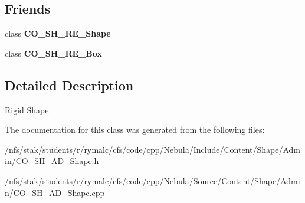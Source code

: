 \subsection*{Friends}
\begin{DoxyCompactItemize}
\item 
\hypertarget{classContent_1_1Shape_1_1Admin_1_1Shape_ada14878e2fc0904acf45a44502c5cca0}{
class {\bfseries CO\_\-SH\_\-RE\_\-Shape}}
\label{classContent_1_1Shape_1_1Admin_1_1Shape_ada14878e2fc0904acf45a44502c5cca0}

\item 
\hypertarget{classContent_1_1Shape_1_1Admin_1_1Shape_ae598bfbad4f6a4fbca774ede1fb477d9}{
class {\bfseries CO\_\-SH\_\-RE\_\-Box}}
\label{classContent_1_1Shape_1_1Admin_1_1Shape_ae598bfbad4f6a4fbca774ede1fb477d9}

\end{DoxyCompactItemize}


\subsection{Detailed Description}
Rigid Shape. 

The documentation for this class was generated from the following files:\begin{DoxyCompactItemize}
\item 
/nfs/stak/students/r/rymalc/cfs/code/cpp/Nebula/Include/Content/Shape/Admin/CO\_\-SH\_\-AD\_\-Shape.h\item 
/nfs/stak/students/r/rymalc/cfs/code/cpp/Nebula/Source/Content/Shape/Admin/CO\_\-SH\_\-AD\_\-Shape.cpp\end{DoxyCompactItemize}
